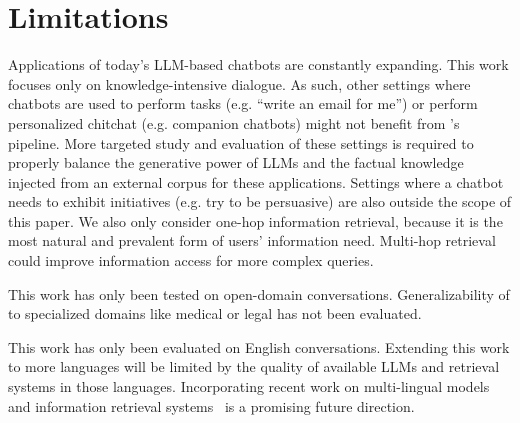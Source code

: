 \section*{Limitations}
Applications of today's LLM-based chatbots are constantly expanding. This work focuses only on knowledge-intensive dialogue. As such, other settings where chatbots are used to perform tasks (e.g. ``write an email for me'') or perform personalized chitchat (e.g. companion chatbots) might not benefit from \system's pipeline. More targeted study and evaluation of these settings is required to properly balance the generative power of LLMs and the factual knowledge injected from an external corpus for these applications. Settings where a chatbot needs to exhibit initiatives (e.g. try to be persuasive) are also outside the scope of this paper.
We also only consider one-hop information retrieval, because it is the most natural and prevalent form of users' information need. Multi-hop retrieval could improve information access for more complex queries. 

This work has only been tested on open-domain conversations. Generalizability of \system to specialized domains like medical or legal has not been evaluated. 

This work has only been evaluated on English conversations. Extending this work to more languages will be limited by the quality of available LLMs and retrieval systems in those languages. Incorporating recent work on multi-lingual models~\cite{scao2022bloom} and information retrieval systems~\cite{colbertx2022} is a promising future direction.